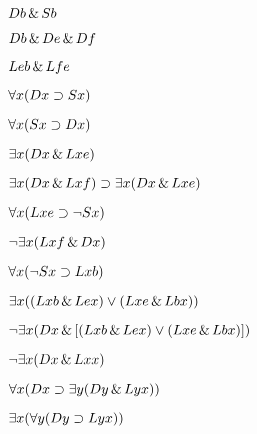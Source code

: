 \begin{earg}
\item %
$Db \,\&\, Sb$
\item %
$Db \,\&\, De \,\&\, Df$
\item %
$Leb \,\&\, Lfe$
\item %
$\forall x(Dx \supset Sx)$
\item %
$\forall x(Sx \supset Dx)$
\item %
$\exists x(Dx \,\&\, Lxe)$
\item %
$\exists x(Dx \,\&\, Lxf) \supset \exists x(Dx \,\&\, Lxe)$
\item %
$\forall x(Lxe \supset \neg Sx)$
\item %
$\neg \exists x(Lxf \,\&\, Dx)$
\item %
$\forall x(\neg Sx \supset Lxb)$
\item %
$\exists x((Lxb \,\&\, Lex) \vee (Lxe \,\&\, Lbx))$
\item %
$\neg \exists x(Dx \,\&\, [(Lxb \,\&\, Lex) \vee (Lxe \,\&\, Lbx)])$
\item %
$\neg \exists x(Dx \,\&\, Lxx)$
\item %
$\forall x(Dx \supset \exists y(Dy \,\&\, Lyx))$
\item %
$\exists x(\forall y(Dy \supset Lyx))$
\end{earg}




